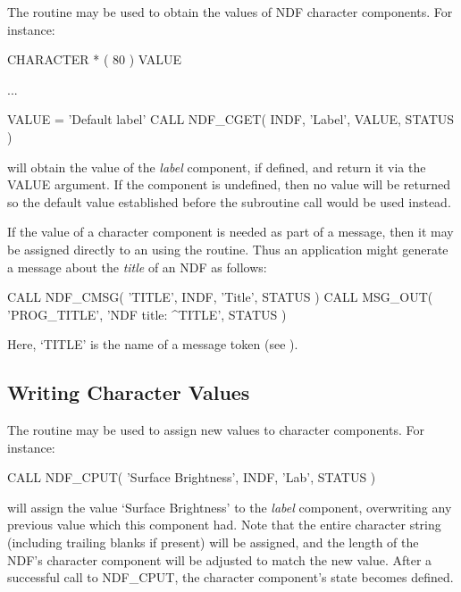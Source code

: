 \documentclass[twoside,11pt,nolof]{starlink}
\providecommand{\st}[1]{{\emph{#1}}}
\begin{document}
The routine  may be used to obtain the values of NDF character
components.
For instance:

\small
\begin{terminalv}
      CHARACTER * ( 80 ) VALUE

      ...

      VALUE = 'Default label'
      CALL NDF_CGET( INDF, 'Label', VALUE, STATUS )
\end{terminalv}
\normalsize

will obtain the value of the \st{label\/} component, if defined, and return
it via the VALUE argument.
If the component is undefined, then no value will be returned so the
default value established before the subroutine call would be used instead.

If the value of a character component is needed as part of a message,
then it may be assigned directly to an  using the  routine.
Thus an application might generate a message about the \st{title\/} of an NDF as
follows:

\small
\begin{terminalv}
      CALL NDF_CMSG( 'TITLE', INDF, 'Title', STATUS )
      CALL MSG_OUT( 'PROG_TITLE', 'NDF title: ^TITLE', STATUS )
\end{terminalv}
\normalsize

Here, `TITLE' is the name of a message token (see
).

\subsection{Writing Character Values}

The routine  may be used to assign new values to character
components.
For instance:

\small
\begin{terminalv}
      CALL NDF_CPUT( 'Surface Brightness', INDF, 'Lab', STATUS )
\end{terminalv}
\normalsize

will assign the value `Surface Brightness' to the \st{label\/} component,
overwriting any previous value which this component had.
Note that the entire character string (including trailing blanks if present)
will be assigned, and the length of the NDF's character component will be
adjusted to match the new value.
After a successful call to NDF\_CPUT, the character component's state
becomes defined.
\end{document}

